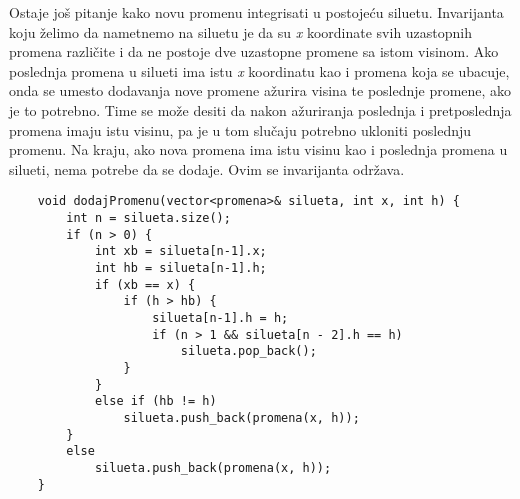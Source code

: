 \documentclass{article}
\begin{document}
\vspace{0.4cm}
Ostaje još pitanje kako novu promenu integrisati u postojeću siluetu. Invarijanta koju želimo da nametnemo na siluetu je da su \textit{x} koordinate svih
uzastopnih promena različite i da ne postoje dve uzastopne promene sa istom
visinom. Ako poslednja promena u silueti ima
istu \textit{x} koordinatu kao i promena koja se ubacuje, onda se umesto dodavanja nove
promene ažurira visina te poslednje promene, ako je to potrebno. Time se može desiti da nakon ažuriranja poslednja i
pretposlednja promena imaju istu visinu, pa je u tom slučaju potrebno ukloniti
poslednju promenu. Na kraju, ako nova promena ima istu visinu kao i poslednja
promena u silueti, nema potrebe da se dodaje. Ovim se invarijanta održava.
\begin{lstlisting}
    void dodajPromenu(vector<promena>& silueta, int x, int h) {
        int n = silueta.size();
        if (n > 0) {
            int xb = silueta[n-1].x;
            int hb = silueta[n-1].h;
            if (xb == x) {
                if (h > hb) {
                    silueta[n-1].h = h;
                    if (n > 1 && silueta[n - 2].h == h)
                        silueta.pop_back();
                }
            } 
            else if (hb != h)
                silueta.push_back(promena(x, h));
        } 
        else
            silueta.push_back(promena(x, h));
    }
\end{lstlisting}
\end{document}
